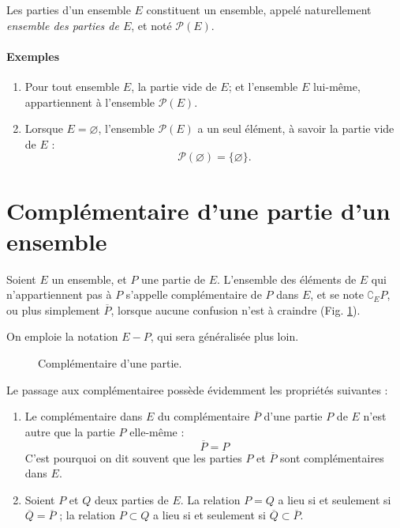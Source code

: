 \documentclass[12pt,parskip=full,chapterprefix=true,a5paper]{scrbook}
\begin{document}
Les parties d'un ensemble \(E\) constituent un ensemble, appelé naturellement \emph{ensemble des parties de \(E\)}, et noté \(\mathcal{P}(E)\).

\paragraph{Exemples}
\begin{enumerate}
\item Pour tout ensemble \(E\), la partie vide de \(E\); et l'ensemble \(E\) lui-même, appartiennent à l'ensemble \(\mathcal{P}(E)\).
\item Lorsque \(E=\varnothing\), l'ensemble \(\mathcal{P}(E)\) a un seul élément, à savoir la partie vide de \(E\) :
  \[
    \mathcal{P}(\varnothing)=\{\varnothing\}.
  \]
\end{enumerate}

\section*{Complémentaire d'une partie d'un ensemble}

Soient \(E\) un ensemble, et \(P\) une partie de \(E\). L'ensemble des éléments de \(E\) qui n'appartiennent pas à \(P\) s'appelle complémentaire de \(P\) dans \(E\), et se note \(\complement_EP\), ou plus simplement \(\overline{P}\), lorsque aucune confusion n'est à craindre (Fig. \ref{fig:complementaire}).

On emploie la notation \(E-P\), qui sera généralisée plus loin.

\begin{figure}[ht]
  \centering
  \caption{\label{fig:complementaire}Complémentaire d'une partie.}
\end{figure}

Le passage aux complémentairee possède évidemment les propriétés suivantes :
\begin{enumerate} [label=\alph*)]
  \item Le complémentaire dans \(E\) du complémentaire \(\overline{P}\) d'une partie \(P\) de \(E\) n'est autre que la partie \(P\) elle-même :
  \[
    \overline{P}=P
  \]
  C'est pourquoi on dit souvent que les parties \(P\) et \(\overline{P}\) sont complémentaires dans \(E\).
\item Soient \(P\) et \(Q\) deux parties de \(E\). La relation \(P=Q\) a lieu si et seulement si \(\overline{Q}=\overline{P}\) ; la relation \(P\subset Q\) a lieu si et seulement si \(\overline{Q}\subset\overline{P}\).
\end{enumerate}
\end{document}
